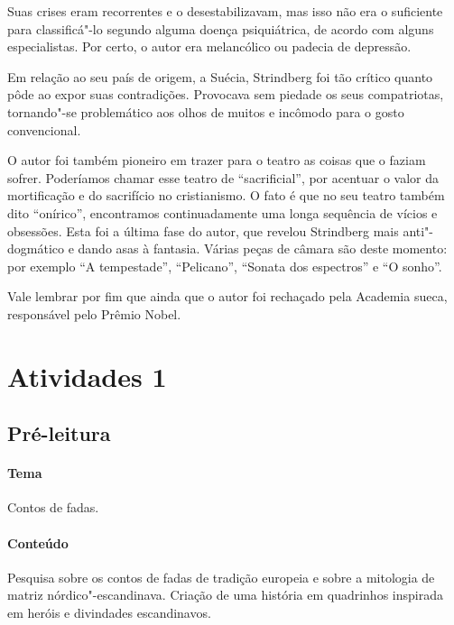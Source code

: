 \documentclass[12pt]{extarticle}
\begin{document}
Suas crises eram recorrentes e o desestabilizavam, mas isso não era o suficiente para classificá"-lo 
segundo alguma doença psiquiátrica, de acordo com alguns especialistas. 
Por certo, o autor era melancólico ou padecia de depressão.

Em relação ao seu país de origem, a Suécia, Strindberg foi tão 
crítico quanto pôde ao expor suas contradições.
Provocava sem piedade os seus compatriotas, tornando"-se problemático aos olhos de muitos e incômodo para o gosto convencional.

O autor foi também pioneiro em trazer para o teatro as coisas que o faziam sofrer. Poderíamos chamar esse teatro de ``sacrificial'', por acentuar o valor da mortificação e do sacrifício no cristianismo. 
O fato é que no seu teatro também dito ``onírico'', encontramos continuadamente uma longa sequência 
de vícios e obsessões. Esta foi a última fase do autor, que revelou Strindberg mais anti"-dogmático e dando asas à fantasia. Várias peças de câmara são deste momento: por exemplo ``A tempestade'', ``Pelicano'', ``Sonata dos espectros'' e ``O sonho''.


Vale lembrar por fim que ainda que o autor foi rechaçado pela Academia sueca, responsável pelo Prêmio Nobel.



\section{Atividades 1}


\subsection{Pré-leitura}


\paragraph{Tema} Contos de fadas.

\paragraph{Conteúdo} Pesquisa sobre os contos de fadas de tradição europeia e sobre a mitologia de matriz nórdico"-escandinava. Criação de uma história em quadrinhos inspirada em heróis e divindades escandinavos.
\end{document}
